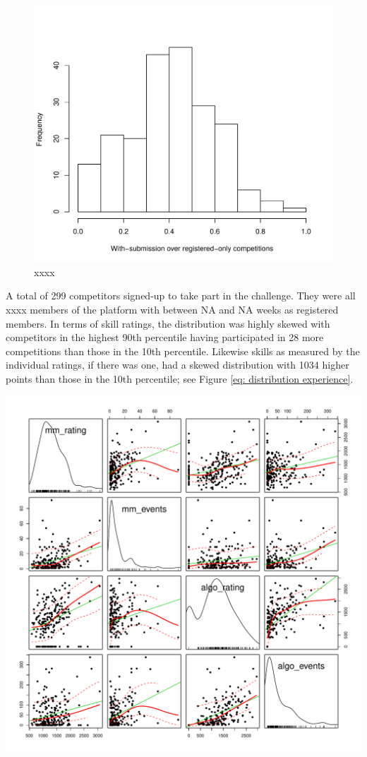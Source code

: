 \documentclass[12pt,]{article}
\theoremstyle{plain} %
\begin{document}
\begin{figure}
\centering
\includegraphics{Figures/unnamed-chunk-9-1.pdf}
\caption{xxxx}
\end{figure}

A total of 299 competitors signed-up to take part in the challenge. They
were all xxxx members of the platform with between NA and NA weeks as
registered members. In terms of skill ratings, the distribution was
highly skewed with competitors in the highest 90th percentile having
participated in 28 more competitions than those in the 10th percentile.
Likewise skills as measured by the individual ratings, if there was one,
had a skewed distribution with 1034 higher points than those in the 10th
percentile; see Figure \ref{eq: distribution experience}.

\includegraphics{Figures/ratings-1.pdf}
\end{document}

